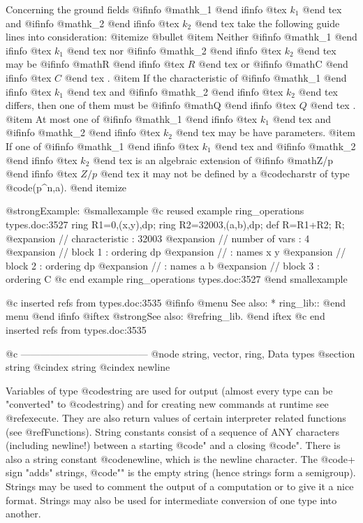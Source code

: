 {{{{{{Concerning the ground fields 
@ifinfo
@math{k_1}
@end ifinfo
@tex
$k_1$
@end tex
 and 
@ifinfo
@math{k_2}
@end ifinfo
@tex
$k_2$
@end tex
 take the
following guide lines into consideration:
@itemize @bullet
@item Neither 
@ifinfo
@math{k_1}
@end ifinfo
@tex
$k_1$
@end tex
 nor 
@ifinfo
@math{k_2}
@end ifinfo
@tex
$k_2$
@end tex
 may be 
@ifinfo
@math{R}
@end ifinfo
@tex
$R$
@end tex
 or 
@ifinfo
@math{C}
@end ifinfo
@tex
$C$
@end tex
.
@item If the characteristic of 
@ifinfo
@math{k_1}
@end ifinfo
@tex
$k_1$
@end tex
 and 
@ifinfo
@math{k_2}
@end ifinfo
@tex
$k_2$
@end tex
 differs, then one of them must be 
@ifinfo
@math{Q}
@end ifinfo
@tex
$Q$
@end tex
.
@item At most one of 
@ifinfo
@math{k_1}
@end ifinfo
@tex
$k_1$
@end tex
 and 
@ifinfo
@math{k_2}
@end ifinfo
@tex
$k_2$
@end tex
 may be have parameters.
@item If one of 
@ifinfo
@math{k_1}
@end ifinfo
@tex
$k_1$
@end tex
 and 
@ifinfo
@math{k_2}
@end ifinfo
@tex
$k_2$
@end tex
 is an algebraic extension of 
@ifinfo
@math{Z/p}
@end ifinfo
@tex
$Z/p$
@end tex
 it may not be defined by a @code{charstr} of type @code{(p^n,a)}.
@end itemize


@strong{Example:}
@smallexample
@c reused example ring_operations types.doc:3527 
  ring R1=0,(x,y),dp;
  ring R2=32003,(a,b),dp;
  def R=R1+R2;
  R;
@expansion{} //   characteristic : 32003
@expansion{} //   number of vars : 4
@expansion{} //        block   1 : ordering dp
@expansion{} //                  : names    x y 
@expansion{} //        block   2 : ordering dp
@expansion{} //                  : names    a b 
@expansion{} //        block   3 : ordering C
@c end example ring_operations types.doc:3527
@end smallexample

@c inserted refs from types.doc:3535
@ifinfo
@menu
See also:
* ring_lib::
@end menu
@end ifinfo
@iftex
@strong{See also:}
@ref{ring_lib}.
@end iftex
@c end inserted refs from types.doc:3535

@c ---------------------------------------
@node string, vector, ring, Data types
@section string
@cindex string
@cindex newline

Variables of type @code{string} are used for output (almost every type
can be "converted" to @code{string}) and for creating new
commands at runtime see @ref{execute}.  They are also return values of
certain interpreter related functions (see @ref{Functions}).  String
constants consist of a sequence of ANY characters (including newline!)
between a starting @code{"} and a closing @code{"}.  There is also a
string constant @code{newline}, which is the newline character.  The
@code{+} sign "adds" strings, @code{""} is the empty string (hence
strings form a semigroup). Strings may be used to comment the output of
a computation or to give it a nice format. Strings may also be used for
intermediate conversion of one type into another.

}}}}}}
